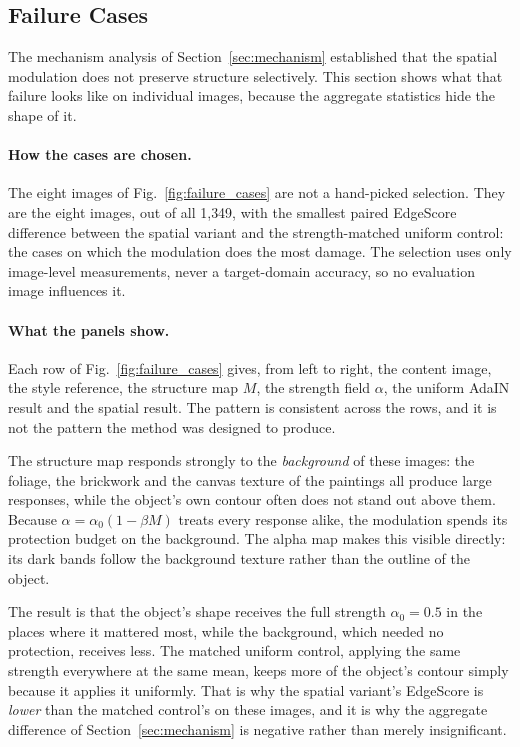 ﻿%
\subsection{Failure Cases}
\label{sec:failure_cases}

The mechanism analysis of Section~\ref{sec:mechanism} established that the
spatial modulation does not preserve structure selectively. This section
shows what that failure looks like on individual images, because the
aggregate statistics hide the shape of it.

\paragraph{How the cases are chosen.}
The eight images of Fig.~\ref{fig:failure_cases} are not a hand-picked
selection. They are the eight images, out of all 1{,}349, with the
smallest paired EdgeScore difference between the spatial variant and the
strength-matched uniform control: the cases on which the modulation does
the most damage. The selection uses only image-level measurements, never a
target-domain accuracy, so no evaluation image influences it.

\paragraph{What the panels show.}
Each row of Fig.~\ref{fig:failure_cases} gives, from left to right, the
content image, the style reference, the structure map $M$, the strength
field $\alpha$, the uniform AdaIN result and the spatial result. The
pattern is consistent across the rows, and it is not the pattern the method
was designed to produce.

The structure map responds strongly to the \emph{background} of these
images: the foliage, the brickwork and the canvas texture of the paintings
all produce large responses, while the object's own contour often does not
stand out above them. Because $\alpha = \alpha_0(1-\beta M)$ treats every
response alike, the modulation spends its protection budget on the
background. The alpha map makes this visible directly: its dark bands
follow the background texture rather than the outline of the object.

The result is that the object's shape receives the full strength
$\alpha_0 = 0.5$ in the places where it mattered most, while the
background, which needed no protection, receives less. The matched
uniform control, applying the same strength everywhere at the same mean,
keeps more of the object's contour simply because it applies it
uniformly. That is why the spatial variant's EdgeScore is \emph{lower}
than the matched control's on these images, and it is why the aggregate
difference of Section~\ref{sec:mechanism} is negative rather than merely
insignificant.

